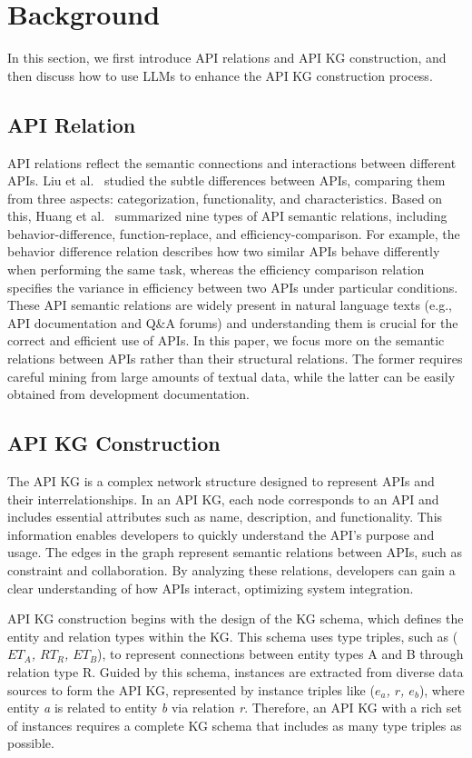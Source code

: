 \section{Background}\label{sec: motivation}
In this section, we first introduce API relations and API KG construction, and then discuss how to use LLMs to enhance the API KG construction process.

\subsection{API Relation}
API relations reflect the semantic connections and interactions between different APIs.
Liu et al.~\cite{Liu2020GeneratingCB} studied the subtle differences between APIs, comparing them from three aspects: categorization, functionality, and characteristics.
Based on this, Huang et al.~\cite{huang2022se} summarized nine types of API semantic relations, including behavior-difference, function-replace, and efficiency-comparison.
For example, the behavior difference relation describes how two similar APIs behave differently when performing the same task, whereas the efficiency comparison relation specifies the variance in efficiency between two APIs under particular conditions.
These API semantic relations are widely present in natural language texts (e.g., API documentation and Q\&A forums) and understanding them is crucial for the correct and efficient use of APIs.
In this paper, we focus more on the semantic relations between APIs rather than their structural relations.
The former requires careful mining from large amounts of textual data, while the latter can be easily obtained from development documentation.

\subsection{API KG Construction}\label{sec: kgcon}
The API KG is a complex network structure designed to represent APIs and their interrelationships.
In an API KG, each node corresponds to an API and includes essential attributes such as name, description, and functionality.
This information enables developers to quickly understand the API's purpose and usage.
The edges in the graph represent semantic relations between APIs, such as constraint and collaboration.
By analyzing these relations, developers can gain a clear understanding of how APIs interact, optimizing system integration.

API KG construction begins with the design of the KG schema, which defines the entity and relation types within the KG.
This schema uses type triples, such as (\textit{$ET_{A}$, $RT_{R}$, $ET_{B}$}), to represent connections between entity types A and B through relation type R.
Guided by this schema, instances are extracted from diverse data sources to form the API KG, represented by instance triples like (\textit{$e_{a}$, $r$, $e_{b}$}), where entity \textit{a} is related to entity \textit{b} via relation \textit{r}.
Therefore, an API KG with a rich set of instances requires a complete KG schema that includes as many type triples as possible.

